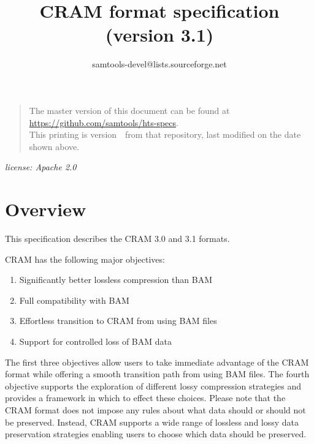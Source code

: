 \documentclass[a4paper]{article}
\begin{document}

\title{CRAM format specification (version 3.1)}
\author{samtools-devel@lists.sourceforge.net}
\date{\headdate}
\maketitle


\begin{quote}\small
The master version of this document can be found at
\url{https://github.com/samtools/hts-specs}.\\
This printing is version~\commitdesc\ from that repository,
last modified on the date shown above.
\end{quote}

\begin{center}
\textit{license: Apache 2.0}
\end{center}
\vspace*{1em}

\section{\textbf{Overview}}

This specification describes the CRAM 3.0 and 3.1 formats.

CRAM has the following major objectives:

\begin{enumerate}
\item Significantly better lossless compression than BAM

\item Full compatibility with BAM

\item Effortless transition to CRAM from using BAM files

\item Support for controlled loss of BAM data
\end{enumerate}

The first three objectives allow users to take immediate advantage of the CRAM 
format while offering a smooth transition path from using BAM files. The fourth 
objective supports the exploration of different lossy compression strategies and 
provides a framework in which to effect these choices. Please note that the CRAM 
format does not impose any rules about what data should or should not be preserved. 
Instead, CRAM supports a wide range of lossless and lossy data preservation strategies 
enabling users to choose which data should be preserved.
\end{document}
